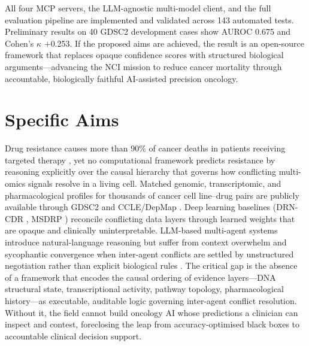 \documentclass[11pt,letterpaper]{article}
\begin{document}
All four MCP servers, the LLM-agnostic multi-model client, and the full evaluation pipeline are
implemented and validated across 143 automated tests. Preliminary results on 40 GDSC2
development cases show AUROC 0.675 and Cohen's $\kappa$ $+$0.253. If the proposed aims
are achieved, the result is an open-source framework that replaces opaque confidence scores
with structured biological arguments---advancing the NCI mission to reduce cancer mortality
through accountable, biologically faithful AI-assisted precision oncology.

\newpage

\section{Specific Aims}

Drug resistance causes more than 90\% of cancer deaths in patients receiving targeted therapy
\cite{ref22}, yet no computational framework predicts resistance by reasoning explicitly over the
causal hierarchy that governs how conflicting multi-omics signals resolve in a living cell.
Matched genomic, transcriptomic, and pharmacological profiles for thousands of cancer cell
line--drug pairs are publicly available through GDSC2 and CCLE/DepMap \cite{ref19,ref20}.
Deep learning baselines (DRN-CDR \cite{ref9}, MSDRP \cite{ref10}) reconcile conflicting data
layers through learned weights that are opaque and clinically uninterpretable. LLM-based
multi-agent systems introduce natural-language reasoning but suffer from context overwhelm
and sycophantic convergence when inter-agent conflicts are settled by unstructured negotiation
rather than explicit biological rules \cite{ref21}. The critical gap is the absence of a framework
that encodes the causal ordering of evidence layers---DNA structural state, transcriptional
activity, pathway topology, pharmacological history---as executable, auditable logic governing
inter-agent conflict resolution. Without it, the field cannot build oncology AI whose predictions
a clinician can inspect and contest, foreclosing the leap from accuracy-optimised black boxes
to accountable clinical decision support.
\end{document}
